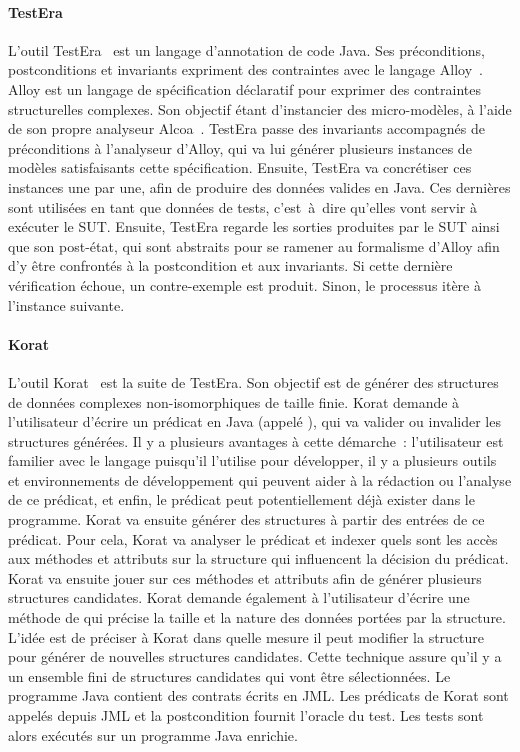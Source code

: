 \paragraph{TestEra} L'outil TestEra~ est un langage
d'annotation de code Java. Ses préconditions, postconditions et invariants
expriment des contraintes avec le langage Alloy~. Alloy est un
langage de spécification déclaratif pour exprimer des contraintes structurelles
complexes. Son objectif étant d'instancier des micro-modèles, à l'aide de son
propre analyseur Alcoa~. TestEra passe des invariants
accompagnés de préconditions à l'analyseur d'Alloy, qui va lui générer plusieurs
instances de modèles satisfaisants cette spécification. Ensuite, TestEra va
concrétiser ces instances une par une, afin de produire des données valides en
Java. Ces dernières sont utilisées en tant que données de tests, c'est~à~dire
qu'elles vont servir à exécuter le SUT. Ensuite, TestEra regarde les sorties
produites par le SUT ainsi que son post-état, qui sont abstraits pour se ramener
au formalisme d'Alloy afin d'y être confrontés à la postcondition et aux
invariants. Si cette dernière vérification échoue, un contre-exemple est
produit. Sinon, le processus itère à l'instance suivante.

\paragraph{Korat} L'outil Korat~ est la suite de TestEra.
Son objectif est de générer des structures de données complexes
non-isomorphiques de taille finie. Korat demande à l'utilisateur d'écrire un
prédicat en Java (appelé ), qui va valider ou invalider les
structures générées. Il y a plusieurs avantages à cette démarche~: l'utilisateur
est familier avec le langage puisqu'il l'utilise pour développer, il y a
plusieurs outils et environnements de développement qui peuvent aider à la
rédaction ou l'analyse de ce prédicat, et enfin, le prédicat peut
potentiellement déjà exister dans le programme. Korat va ensuite générer des
structures à partir des entrées de ce prédicat. Pour cela, Korat va analyser le
prédicat et indexer quels sont les accès aux méthodes et attributs sur la
structure qui influencent la décision du prédicat. Korat va ensuite jouer sur
ces méthodes et attributs afin de générer plusieurs structures candidates.
Korat demande également à l'utilisateur d'écrire une méthode de
 qui précise la taille et la nature des données portées
par la structure. L'idée est de préciser à Korat dans quelle mesure il peut
modifier la structure pour générer de nouvelles structures candidates. Cette
technique assure qu'il y a un ensemble fini de structures candidates qui vont
être sélectionnées. Le programme Java contient des contrats écrits en JML. Les
prédicats de Korat sont appelés depuis JML et la postcondition fournit l'oracle
du test. Les tests sont alors exécutés sur un programme Java enrichie.

